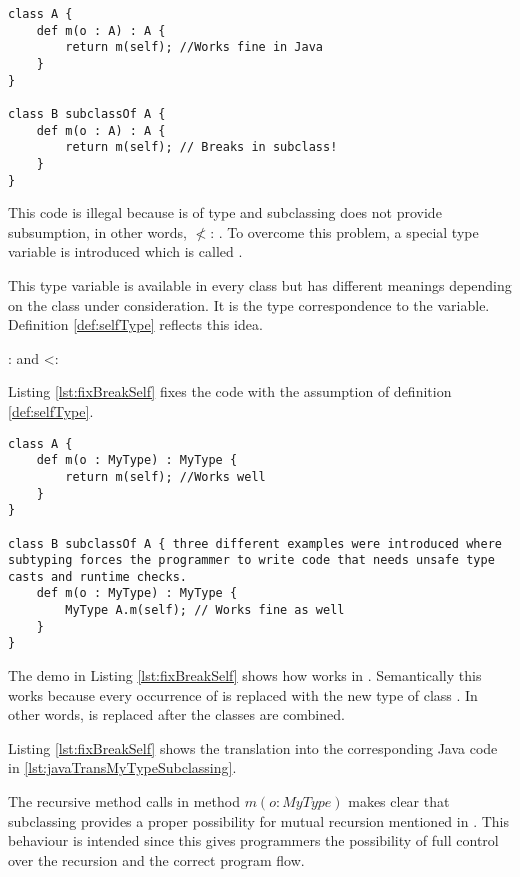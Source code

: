 \begin{lstlisting}[float=ht,language=ooplss,caption=Illegal method m(o : \A) : \emph{Void} in class \B.,label=lst:breakSelf]
class A {
	def m(o : A) : A {
		return m(self); //Works fine in Java
	}
}

class B subclassOf A {
	def m(o : A) : A {
		return m(self); // Breaks in subclass!
	}
}
\end{lstlisting}

This code is illegal because \self is of type \B and subclassing does
not provide subsumption, in other words, \B $\nless$: \A. To overcome this problem,
a special type variable is introduced which is called \mytype.

This type variable is available in every class but has different meanings
depending on the class under consideration. It is the type correspondence
to the \self variable. Definition \ref{def:selfType} reflects this idea.

\begin{defn}
	\label{def:selfType}
	\self : \X and \X <: \mytype
\end{defn}

Listing \ref{lst:fixBreakSelf} fixes the code with the assumption of
definition \ref{def:selfType}.

\begin{lstlisting}[float=ht,language=ooplss,caption=Type safe code with \mytype.,label=lst:fixBreakSelf]
class A {
	def m(o : MyType) : MyType {
		return m(self); //Works well
	}
}

class B subclassOf A { three different examples were introduced where subtyping forces the programmer to write code that needs unsafe type casts and runtime checks.
	def m(o : MyType) : MyType {
		MyType A.m(self); // Works fine as well
	}
}
\end{lstlisting}

The demo in Listing \ref{lst:fixBreakSelf} shows how \mytype works
in \ooplss. Semantically this works because every occurrence of \mytype
is replaced with the new type of class \B. In other words, \mytype is
replaced after the classes are combined.

Listing \ref{lst:fixBreakSelf} shows the translation into the corresponding
Java code in \ref{lst:javaTransMyTypeSubclassing}.

The recursive
method calls in method $m(o : MyType)$ makes clear that subclassing
provides a proper possibility for mutual recursion mentioned in
. This behaviour is intended since this gives
programmers the possibility of full control over the recursion
and the correct program flow.

